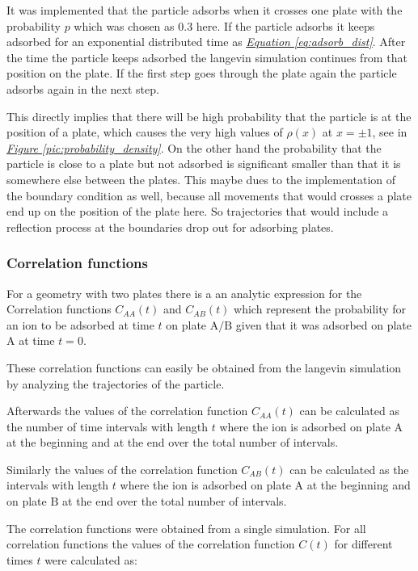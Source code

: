 \documentclass[a4paper, parskip=half]{scrartcl}
\newcommand{\myFigRef}[1]{\textit{\hyperref[#1]{Figure \ref*{#1}}}}
\newcommand{\myEqRef}[1]{\textit{\hyperref[eq:#1]{Equation \ref*{eq:#1}}}}
\begin{document}
It was implemented that the particle adsorbs when it crosses one plate with the probability $p$ which was chosen as $0.3$ here. 
If the particle adsorbs it keeps adsorbed for an exponential distributed time as \myEqRef{adsorb_dist}. After the time the particle keeps adsorbed the langevin simulation continues from that position on the plate. If the first step goes through the plate again the particle adsorbs again in the next step.

This directly implies that there will be high probability that the particle is at the position of a plate, which causes the very high values of $\rho(x)$ at $x = \pm 1$, see in \myFigRef{pic:probability_density}. On the other hand the probability that the particle is close to a plate but not adsorbed is significant smaller than that it is somewhere else between the plates. This maybe dues to the implementation of the boundary condition as well, because all movements that would crosses a plate end up on the position of the plate here. So trajectories that would include a reflection process at the boundaries drop out for adsorbing plates. 


\subsubsection{Correlation functions}
For a geometry with two plates there is a an analytic expression for the Correlation functions $C_{AA}(t)$ and $C_{AB}(t)$ which represent the probability for an ion to be adsorbed at time $t$ on plate $\mathrm{A}/\mathrm{B}$ given that it was adsorbed on plate $\mathrm{A}$ at time $t=0$.

These correlation functions can easily be obtained from the langevin simulation by analyzing the trajectories of the particle. 

Afterwards the values of the correlation function $C_{AA}(t)$ can be calculated as the number of time intervals with length $t$ where the ion is adsorbed on plate $\mathrm{A}$ at the beginning and at the end over the total number of intervals.

Similarly the values of the correlation function $C_{AB}(t)$ can be calculated as the intervals with length $t$ where the ion is adsorbed on plate $\mathrm{A}$ at the beginning and on plate $\mathrm{B}$ at the end over the total number of intervals.

The correlation functions were obtained from a single simulation. For all correlation functions the values of the correlation function $C(t)$ for different times $t$ were calculated as:
\end{document}
